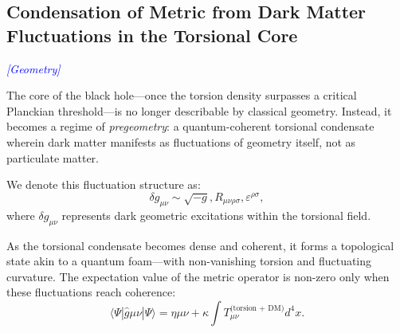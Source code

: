 \documentclass{article}
\newcommand{\geometrytag}{\textcolor{blue}{\textit{[Geometry]}}}
\begin{document}
\medskip
\begin{center}
\end{center}
\medskip



\subsection{Condensation of Metric from Dark Matter Fluctuations in the Torsional Core}
\geometrytag

The core of the black hole---once the torsion density surpasses a critical Planckian threshold---is no longer describable by classical geometry. Instead, it becomes a regime of \textit{pregeometry}: a quantum-coherent torsional condensate wherein dark matter manifests as fluctuations of geometry itself, not as particulate matter.

We denote this fluctuation structure as: \begin{equation} \delta g_{\mu\nu} \sim \sqrt{-g} , R_{\mu\nu\rho\sigma} , \varepsilon^{\rho\sigma}, \end{equation} where $\delta g_{\mu\nu}$ represents dark geometric excitations within the torsional field.

As the torsional condensate becomes dense and coherent, it forms a topological state akin to a quantum foam---with non-vanishing torsion and fluctuating curvature. The expectation value of the metric operator is non-zero only when these fluctuations reach coherence: \begin{equation} \langle \Psi | \hat{g}{\mu\nu} | \Psi \rangle = \eta{\mu\nu} + \kappa \int T_{\mu\nu}^{\text{(torsion + DM)}} d^4x. \end{equation}
\end{document}
